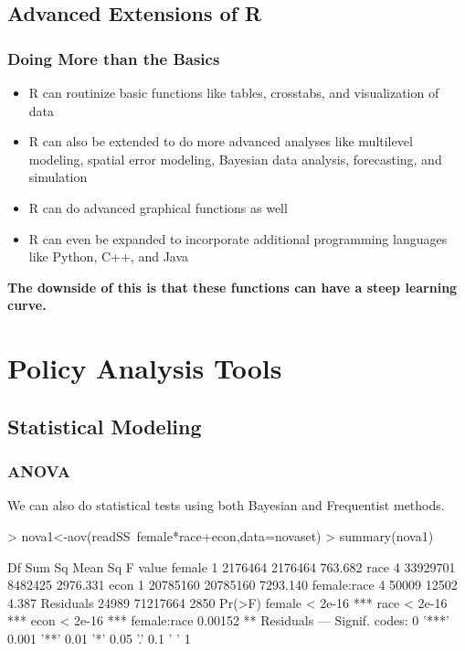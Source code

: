 \documentclass{beamer}
\begin{document}
\subsection{Advanced Extensions of R}
\begin{frame}
\frametitle{Doing More than the Basics}
  \begin{itemize}
  \item R can routinize basic functions like tables, crosstabs, and visualization of data
  \item R can also be extended to do more advanced analyses like multilevel modeling, spatial error modeling, Bayesian data analysis, forecasting, and simulation
  \item R can do advanced graphical functions as well
  \item R can even be expanded to incorporate additional programming languages like Python, C++, and Java
  \end{itemize}
\textbf{The downside of this is that these functions can have a steep learning curve.}
\end{frame}

\section{Policy Analysis Tools}
\subsection{Statistical Modeling}

\begin{frame}[containsverbatim]
\frametitle{ANOVA}
We can also do statistical tests using both Bayesian and Frequentist methods.
\begin{Schunk}
\begin{Sinput}
> nova1<-aov(readSS~female*race+econ,data=novaset)
> summary(nova1)
\end{Sinput}
\begin{Soutput}
               Df   Sum Sq  Mean Sq  F value
female          1  2176464  2176464  763.682
race            4 33929701  8482425 2976.331
econ            1 20785160 20785160 7293.140
female:race     4    50009    12502    4.387
Residuals   24989 71217664     2850         
             Pr(>F)    
female      < 2e-16 ***
race        < 2e-16 ***
econ        < 2e-16 ***
female:race 0.00152 ** 
Residuals              
---
Signif. codes:  0 '***' 0.001 '**' 0.01 '*' 0.05 '.' 0.1 ' ' 1 
\end{Soutput}
\end{Schunk}
\end{frame}
\end{document}
